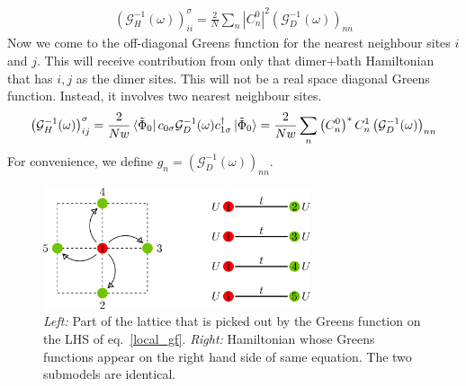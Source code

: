 \documentclass{article}
\numberwithin{equation}{section}
\begin{document}
\begin{equation}\begin{aligned}
	\left(\mathcal{G}_{H}^{-1}(\omega)\right)_{ii}^\sigma = \frac{2}{N}\sum_{n} |C^0_{n}|^2 \left(\mathcal{G}_{D}^{-1}(\omega)\right)_{n n} 
\end{aligned}\end{equation}
Now we come to the off-diagonal Greens function for the nearest neighbour sites $i$ and $j$. This will receive contribution from only that dimer+bath Hamiltonian that has \(i,j\) as the dimer sites. This will not be a real space diagonal Greens function. Instead, it involves two nearest neighbour sites. %
\begin{gather}
\label{nn_gf}
\left(\mathcal{G}_{H}^{-1}(\omega)\right)_{ij}^\sigma = \frac{2}{Nw}\bra{\tilde \Phi_0}c_{0\sigma}\mathcal{G}_{D}^{-1}(\omega)c^\dagger_{1\sigma}\ket{\tilde \Phi_0} = \frac{2}{Nw}\sum_{n} \left(C^0_{n}\right)^* C^1_{n} \left(\mathcal{G}_{D}^{-1}(\omega)\right)_{nn} 
\end{gather}
For convenience, we define $g_n = \left(\mathcal{G}_{D}^{-1}(\omega)\right)_{nn}$.
\begin{figure}[htpb!]
	\centering
	\hspace*{\fill}
	\includegraphics[width=0.7\textwidth]{lattice.png}
	\hspace*{\fill}
	\caption{\textit{Left:} Part of the lattice that is picked out by the Greens function on the LHS of eq.~\ref{local_gf}. \textit{Right:} Hamiltonian whose Greens functions appear on the right hand side of same equation. The two submodels are identical.}
\end{figure}
\\\\
\end{document}

